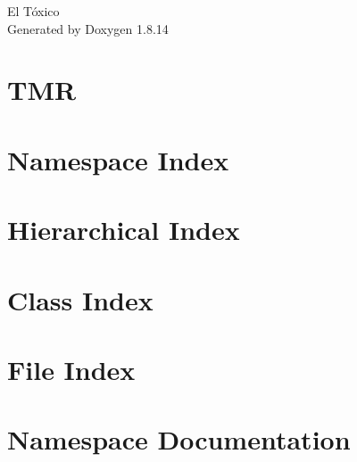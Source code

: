 \documentclass[twoside]{book}
\newcommand{\+}{\discretionary{\mbox{\scriptsize$\hookleftarrow$}}{}{}}
\newcommand{\clearemptydoublepage}{%
  \newpage{\pagestyle{empty}\cleardoublepage}%
}
\begin{document}
\hypersetup{pageanchor=false,
             bookmarksnumbered=true,
             pdfencoding=unicode
            }
\begin{titlepage}
\vspace*{7cm}
\begin{center}%
{\Large El Tóxico }\\
\vspace*{1cm}
{\large Generated by Doxygen 1.8.14}\\
\end{center}
\end{titlepage}
\clearemptydoublepage
{}
\tableofcontents
\clearemptydoublepage
{}
\hypersetup{pageanchor=true}

\chapter{T\+MR}
\label{index}\hypertarget{index}{}
\chapter{Namespace Index}

\chapter{Hierarchical Index}

\chapter{Class Index}

\chapter{File Index}

\chapter{Namespace Documentation}












\end{document}

